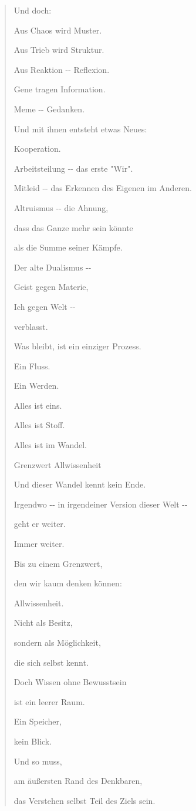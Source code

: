 \documentclass[
  ngerman,
]{article}
\begin{document}
\begin{quote}
Und doch:

Aus Chaos wird Muster.

Aus Trieb wird Struktur.

Aus Reaktion -\/- Reflexion.

Gene tragen Information.

Meme -\/- Gedanken.

Und mit ihnen entsteht etwas Neues:

Kooperation.

Arbeitsteilung -\/- das erste "Wir".

Mitleid -\/- das Erkennen des Eigenen im Anderen.

Altruismus -\/- die Ahnung,

dass das Ganze mehr sein könnte

als die Summe seiner Kämpfe.

Der alte Dualismus -\/-

Geist gegen Materie,

Ich gegen Welt -\/-

verblasst.

Was bleibt, ist ein einziger Prozess.

Ein Fluss.

Ein Werden.

Alles ist eins.

Alles ist Stoff.

Alles ist im Wandel.

Grenzwert Allwissenheit

Und dieser Wandel kennt kein Ende.

Irgendwo -\/- in irgendeiner Version dieser Welt -\/-

geht er weiter.

Immer weiter.

Bis zu einem Grenzwert,

den wir kaum denken können:

Allwissenheit.

Nicht als Besitz,

sondern als Möglichkeit,

die sich selbst kennt.

Doch Wissen ohne Bewusstsein

ist ein leerer Raum.

Ein Speicher,

kein Blick.

Und so muss,

am äußersten Rand des Denkbaren,

das Verstehen selbst Teil des Ziels sein.


\end{quote}
\end{document}
